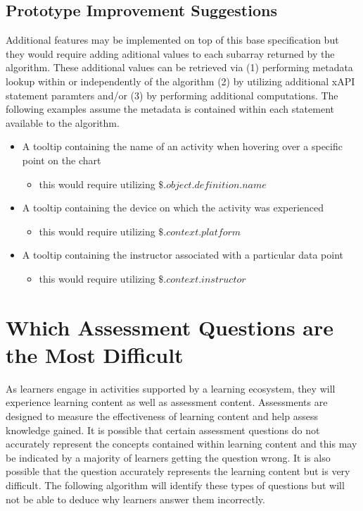 \documentclass{article}
\begin{document}
\subsection{Prototype Improvement Suggestions}
Additional features may be implemented on top of this base
specification but they would require adding aditional values to each
subarray returned by the algorithm. These additional values can be
retrieved via (1) performing metadata lookup within or independently of the
algorithm (2) by utilizing additional xAPI statement paramters and/or (3) by
performing additional computations. The following examples assume the
metadata is contained within each statement available to the algorithm.
\begin{itemize}
\item A tooltip containing the name of an activity when hovering
  over a specific point on the chart
  \begin{itemize}
  \item this would require utilizing $\$.object.definition.name$
  \end{itemize}
\item A tooltip containing the device on which the activity was experienced
  \begin{itemize}
  \item this would require utilizing $\$.context.platform$
  \end{itemize}
\item A tooltip containing the instructor associated with a
  particular data point
  \begin{itemize}
  \item this would require utilizing $\$.context.instructor$
  \end{itemize}
\end{itemize}

\section{Which Assessment Questions are the Most Difficult}
As learners engage in activities supported by a learning ecosystem, they will
experience learning content as well as assessment content. Assessments
are designed to measure the effectiveness of learning content and help
assess knowledge gained. It is possible that certain assessment questions
do not accurately represent the concepts contained within learning
content and this may be indicated by a majority of learners getting
the question wrong. It is also possible that the question accurately
represents the learning content but is very difficult. The following
algorithm will identify these types of questions but will not be able to deduce
why learners answer them incorrectly.
\end{document}
